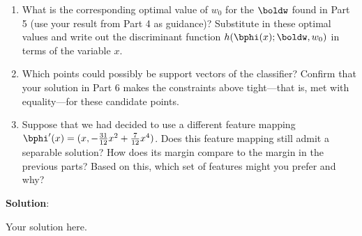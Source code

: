 \documentclass[submit]{../harvardml}
\newenvironment{solution}{
    \vspace{2mm}
    \color{blue}\noindent\textbf{Solution}:
}{}
\begin{document}
\begin{problem}
\begin{enumerate}
    \item What is the corresponding optimal value of $w_0$ for the $\boldw$ found in Part 5 (use your result from Part 4 as guidance)? Substitute in these optimal values and write out the discriminant function
    $h(\bphi(x);\boldw,w_0)$ in terms of the variable $x$.

    \item Which points could possibly be support vectors of the classifier?  Confirm that
    your solution in Part 6 makes the constraints above tight---that is,
    met with equality---for these candidate points.

    \item Suppose that we had decided to use a different feature mapping
    $\bphi'(x) = (x, -\frac{31}{12}x^2 + \frac{7}{12}x^4 )$.  Does
    this feature mapping still admit a separable solution?  How does
    its margin compare to the margin in the previous parts?  Based on
    this, which set of features might you prefer and why?   
  \end{enumerate}
\end{problem}

\begin{solution}
	Your solution here.
\end{solution}


\newpage

\end{document}
